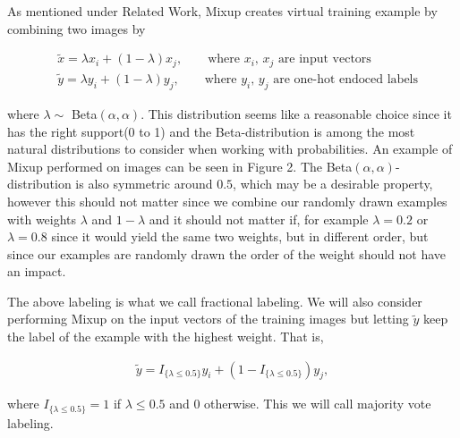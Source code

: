 \documentclass{article}
\begin{document}
As mentioned under Related Work, Mixup creates virtual training example by combining two images by 

\begin{align*}
&\tilde{x} = \lambda x_i + (1-\lambda) x_j, \qquad \text{where $x_i$, $x_j$ are input vectors} \\
&\tilde{y} = \lambda y_i + (1-\lambda) y_j, \qquad \text{where $y_i$, $y_j$ are one-hot endoced labels}
\end{align*}

where $\lambda \sim$ Beta$(\alpha, \alpha)$.
 This distribution seems like a 
reasonable choice since it has the right support(0 to 1) and the Beta-distribution is among the most natural distributions to
consider when working with probabilities. 
An example of Mixup performed on images can be seen in Figure 2.
The Beta$(\alpha, \alpha)$-distribution is also symmetric around $0.5$, which may be 
a desirable property, however this should not matter since we combine our randomly drawn examples with weights $\lambda$ and $1-\lambda$ and 
it should not matter if, for example $\lambda = 0.2$ or $\lambda = 0.8$ since it would yield the same two weights, but in different order, but 
since our examples are randomly drawn the order of the weight should not have an impact. 

% 

The above labeling is what we call fractional labeling.
We will also consider performing Mixup on the input vectors of the training images but letting $\tilde{y}$ keep the label of the example 
with the highest weight. That is,

\begin{align*}
\tilde{y} = I_{\{ \lambda \leq 0.5 \}} y_i + (1-I_{\{ \lambda \leq 0.5 \}}) y_j, 
\end{align*}

where $I_{\{ \lambda \leq 0.5 \}} = 1$ if $\lambda \leq 0.5$ and $0$ otherwise. This we will call majority vote labeling.
\end{document}
